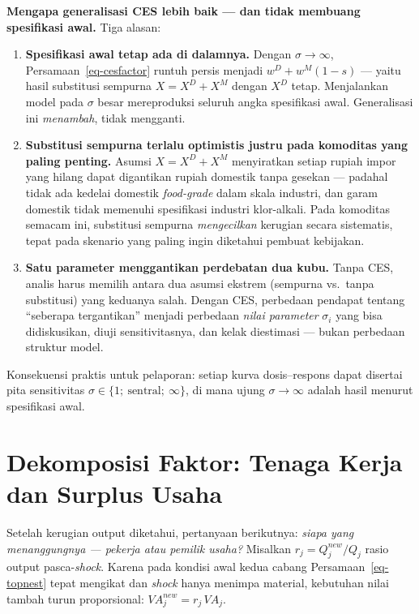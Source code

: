\documentclass[
  manuscript=article,
  layout=publish,
  year=2026,
  volume=1,
]{den}
\providecommand{\tightlist}{%
  \setlength{\itemsep}{0pt}\setlength{\parskip}{0pt}}
\begin{document}
\textbf{Mengapa generalisasi CES lebih baik --- dan tidak membuang
spesifikasi awal.} Tiga alasan:

\begin{enumerate}
\def\labelenumi{\arabic{enumi}.}
\tightlist
\item
  \textbf{Spesifikasi awal tetap ada di dalamnya.} Dengan
  \(\sigma \to \infty\), Persamaan~\ref{eq-cesfactor} runtuh persis
  menjadi \(w^D + w^M(1-s)\) --- yaitu hasil substitusi sempurna
  \(X = X^D + X^M\) dengan \(X^D\) tetap. Menjalankan model pada
  \(\sigma\) besar mereproduksi seluruh angka spesifikasi awal.
  Generalisasi ini \emph{menambah}, tidak mengganti.
\item
  \textbf{Substitusi sempurna terlalu optimistis justru pada komoditas
  yang paling penting.} Asumsi \(X = X^D + X^M\) menyiratkan setiap
  rupiah impor yang hilang dapat digantikan rupiah domestik tanpa
  gesekan --- padahal tidak ada kedelai domestik \emph{food-grade} dalam
  skala industri, dan garam domestik tidak memenuhi spesifikasi industri
  klor-alkali. Pada komoditas semacam ini, substitusi sempurna
  \emph{mengecilkan} kerugian secara sistematis, tepat pada skenario
  yang paling ingin diketahui pembuat kebijakan.
\item
  \textbf{Satu parameter menggantikan perdebatan dua kubu.} Tanpa CES,
  analis harus memilih antara dua asumsi ekstrem (sempurna vs.~tanpa
  substitusi) yang keduanya salah. Dengan CES, perbedaan pendapat
  tentang ``seberapa tergantikan'' menjadi perbedaan \emph{nilai
  parameter} \(\sigma_i\) yang bisa didiskusikan, diuji sensitivitasnya,
  dan kelak diestimasi --- bukan perbedaan struktur model.
\end{enumerate}

Konsekuensi praktis untuk pelaporan: setiap kurva dosis--respons dapat
disertai pita sensitivitas
\(\sigma \in \{1;\ \text{sentral};\ \infty\}\), di mana ujung
\(\sigma \to \infty\) adalah hasil menurut spesifikasi awal.

\section{Dekomposisi Faktor: Tenaga Kerja dan Surplus
Usaha}\label{sec-factor}

Setelah kerugian output diketahui, pertanyaan berikutnya: \emph{siapa
yang menanggungnya --- pekerja atau pemilik usaha?} Misalkan
\(r_j = Q^{new}_j / Q_j\) rasio output pasca-\emph{shock}. Karena pada
kondisi awal kedua cabang Persamaan~\ref{eq-topnest} tepat mengikat dan
\emph{shock} hanya menimpa material, kebutuhan nilai tambah turun
proporsional: \(VA^{new}_j = r_j \, VA_j\).
\end{document}
